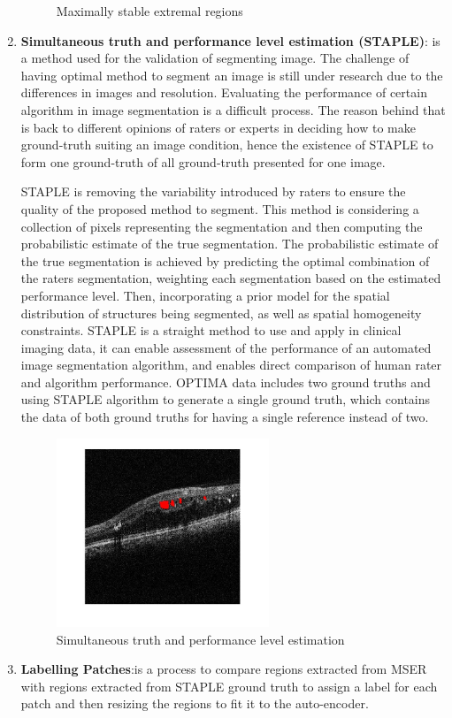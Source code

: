 \begin{enumerate}
\begin{figure}[htb]
  \caption{Maximally stable extremal regions}
  \label{fig:Segmentation Pipeline}
\end{figure} 
\item\textbf{Simultaneous truth and performance level estimation (STAPLE)}: is a method used for the validation of segmenting image.
The challenge of having optimal method to segment an image is still under research due to the differences in images and resolution.
Evaluating the performance of certain algorithm in image segmentation is a difficult process.
The reason behind that is back to different opinions of raters or experts in deciding how to make ground-truth suiting an image condition, hence the existence of STAPLE to form one ground-truth of all ground-truth presented for one image.

STAPLE is removing the variability introduced by raters to ensure the quality of the proposed method to segment.
This method is considering a collection of pixels representing the segmentation and then computing the probabilistic estimate of the true segmentation.
The probabilistic estimate of the true segmentation is achieved by predicting the optimal combination of the raters segmentation, weighting each segmentation based on the estimated performance level.
Then, incorporating a prior model for the spatial distribution of structures being segmented, as well as spatial homogeneity constraints.
STAPLE is a straight method to use and apply in clinical imaging data, it can enable assessment of the performance of an automated image segmentation algorithm, and enables direct comparison of human rater and algorithm performance\cite{warfield2004simultaneous}.
OPTIMA data includes two ground truths and using STAPLE algorithm to generate a single ground truth, which contains the data of both ground truths for having a single reference instead of two.
\begin{figure}[htb]
        \centering
        \includegraphics[width = 0.6\textwidth, height = 0.4\textheight]{figures/STAPLE.jpg} %
  \caption{Simultaneous truth and performance level estimation}
  \label{fig:Segmentation Pipeline}
\end{figure}
\item\textbf{Labelling Patches}:is a process to compare regions extracted from MSER with regions extracted from STAPLE ground truth to assign a label for each patch and then resizing the regions to fit it to the auto-encoder.
\end{enumerate}


